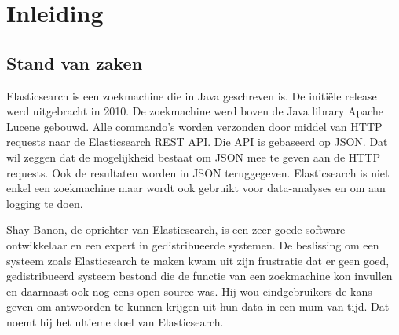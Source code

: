 
\chapter{Inleiding}
\label{ch:inleiding}

\section{Stand van zaken}
\label{sec:stand-van-zaken}

Elasticsearch is een zoekmachine die in Java geschreven is. De initiële release werd uitgebracht in 2010. De zoekmachine werd boven de Java library Apache Lucene gebouwd. Alle commando's worden verzonden door middel van HTTP requests naar de Elasticsearch REST API. Die API is gebaseerd op JSON. Dat wil zeggen dat de mogelijkheid bestaat om JSON mee te geven aan de HTTP requests. Ook de resultaten worden in JSON teruggegeven. Elasticsearch is niet enkel een zoekmachine maar wordt ook gebruikt voor data-analyses en om aan logging te doen.

Shay Banon, de oprichter van Elasticsearch, is een zeer goede software ontwikkelaar en een expert in gedistribueerde systemen. De beslissing om een systeem zoals Elasticsearch te maken kwam uit zijn frustratie dat er geen goed, gedistribueerd systeem bestond die de functie van een zoekmachine kon invullen en daarnaast ook nog eens open source was. Hij wou eindgebruikers de kans geven om antwoorden te kunnen krijgen uit hun data in een mum van tijd. Dat noemt hij het ultieme doel van Elasticsearch.

